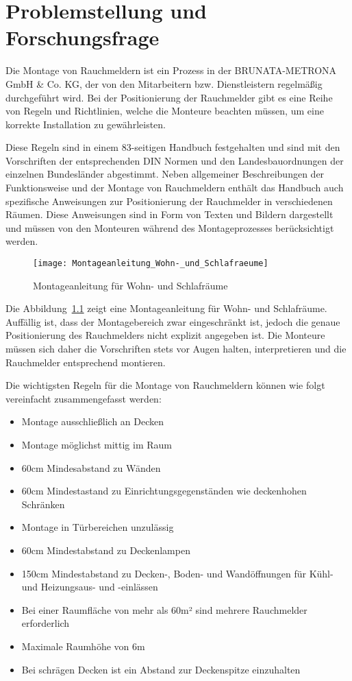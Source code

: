 \chapter{Problemstellung und Forschungsfrage}

Die Montage von Rauchmeldern ist ein Prozess in der BRUNATA-METRONA GmbH \& Co. KG, der von den Mitarbeitern bzw. Dienstleistern regelmäßig durchgeführt wird. Bei der Positionierung der Rauchmelder gibt es eine Reihe von Regeln und Richtlinien, welche die Monteure beachten müssen, um eine korrekte Installation zu gewährleisten. 

Diese Regeln sind in einem 83-seitigen Handbuch festgehalten und sind mit den Vorschriften der entsprechenden DIN Normen und den Landesbauordnungen der einzelnen Bundesländer abgestimmt. Neben allgemeiner Beschreibungen der Funktionsweise und der Montage von Rauchmeldern enthält das Handbuch auch spezifische Anweisungen zur Positionierung der Rauchmelder in verschiedenen Räumen. Diese Anweisungen sind in Form von Texten und Bildern dargestellt und müssen von den Monteuren während des Montageprozesses berücksichtigt werden.


\begin{figure}
\centering
\texttt{[image: Montageanleitung\_Wohn-\_und\_Schlafraeume]}
\caption{Montageanleitung für Wohn- und Schlafräume\label{fig:Anleitung}}\par
\end{figure}

Die Abbildung~\ref{fig:Anleitung} zeigt eine Montageanleitung für Wohn- und Schlafräume. Auffällig ist, dass der Montagebereich zwar eingeschränkt ist, jedoch die genaue Positionierung des Rauchmelders nicht explizit angegeben ist. Die Monteure müssen sich daher die Vorschriften stets vor Augen halten, interpretieren und die Rauchmelder entsprechend montieren. 

Die wichtigsten Regeln für die Montage von Rauchmeldern können wie folgt vereinfacht zusammengefasst werden:

\begin{itemize}
    \item Montage ausschließlich an Decken
    \item Montage möglichst mittig im Raum
    \item 60cm Mindesabstand zu Wänden
    \item 60cm Mindestastand zu Einrichtungsgegenständen wie deckenhohen Schränken
    \item Montage in Türbereichen unzulässig
    \item 60cm Mindestabstand zu Deckenlampen
    \item 150cm Mindestabstand zu Decken-, Boden- und Wandöffnungen für Kühl- und Heizungsaus- und -einlässen 
    \item Bei einer Raumfläche von mehr als 60m² sind mehrere Rauchmelder erforderlich
    \item Maximale Raumhöhe von 6m
    \item Bei schrägen Decken ist ein Abstand zur Deckenspitze einzuhalten
\end{itemize}


